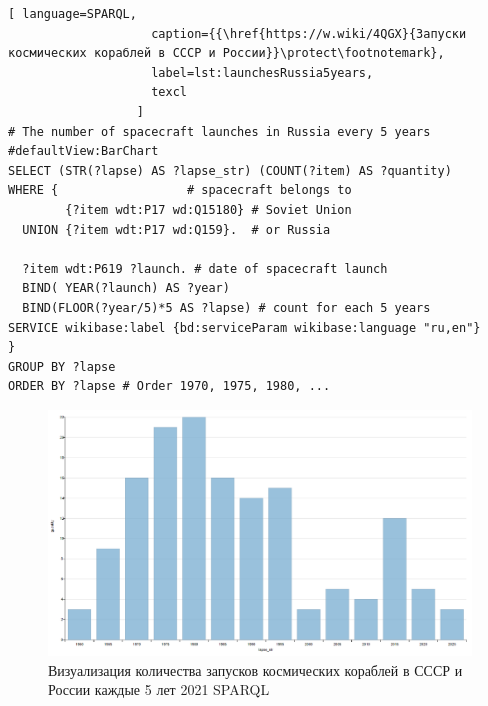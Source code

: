 \label{question:spacecraft_1}
\begin{lstlisting}[ language=SPARQL, 
                    caption={{\href{https://w.wiki/4QGX}{Запуски космических кораблей в СССР и России}}\protect\footnotemark}, 
                    label=lst:launchesRussia5years,
                    texcl
                  ]
# The number of spacecraft launches in Russia every 5 years
#defaultView:BarChart
SELECT (STR(?lapse) AS ?lapse_str) (COUNT(?item) AS ?quantity)
WHERE {                  # spacecraft belongs to
        {?item wdt:P17 wd:Q15180} # Soviet Union
  UNION {?item wdt:P17 wd:Q159}.  # or Russia
  
  ?item wdt:P619 ?launch. # date of spacecraft launch
  BIND( YEAR(?launch) AS ?year) 
  BIND(FLOOR(?year/5)*5 AS ?lapse) # count for each 5 years
SERVICE wikibase:label {bd:serviceParam wikibase:language "ru,en"}
} 
GROUP BY ?lapse
ORDER BY ?lapse # Order 1970, 1975, 1980, ...
\end{lstlisting}

\begin{figure}[h!]
  \includegraphics[width=\linewidth]{graphics/chapter/spacecraft_space_station/ImgRU.png}
  \caption[График Россия]{Визуализация количества запусков космических кораблей в СССР и России каждые 5 лет 2021 SPARQL}%
  \label{fig:launchesRussia5years}%
\end{figure}

